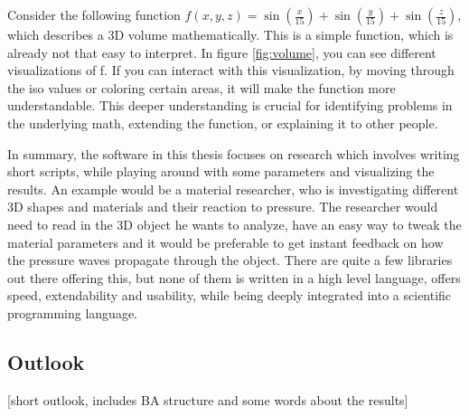 Consider the following function $f(x,y,z)=\sin(\frac{x}{15})+\sin(\frac{y}{15})+\sin(\frac{z}{15})$, which describes a 3D volume mathematically. 
This is a simple function, which is already not that easy to interpret. In figure \ref{fig:volume}, you can see different visualizations of f.
If you can interact with this visualization, by moving through the iso values or coloring certain areas, it will make the function more understandable.
This deeper understanding is crucial for identifying problems in the underlying math, extending the function, or explaining it to other people.

In summary, the software in this thesis focuses on research which involves writing short scripts, while playing around with some parameters and visualizing the results.
An example would be a material researcher, who is investigating different 3D shapes and materials and their reaction to pressure.
The researcher would need to read in the 3D object he wants to analyze, have an easy way to tweak the material parameters and it would be preferable to get instant feedback on how the pressure waves propagate through the object.
There are quite a few libraries out there offering this, but none of them is written in a high level language, offers speed, extendability and usability, while being deeply integrated into a scientific programming language.

\subsection{Outlook}
[short outlook, includes BA structure and some words about the results]
